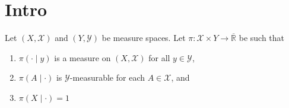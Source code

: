 %

\chapter{Intro}

\begin{definition}
    \label{def:properProbabilityKernel}
    \leanok
    Let $(X,\mathcal{X})$ and $(Y,\mathcal{Y})$ be measure spaces. Let $\pi:\mathcal{X}\times Y\to\overline{\mathbb{R}}$ be such that
    \begin{enumerate}
        \item $\pi(\cdot\mid y)$ is a measure on $(X,\mathcal{X})$ for all $y\in \mathcal{Y}$,
        \item $\pi(A\mid\cdot)$ is $\mathcal{Y}$-measurable for each $A\in\mathcal{X}$, and
        \item $\pi(X\mid\cdot)=1$
    \end{enumerate}
\end{definition}

\begin{definition}[Specification]
    \label{def:specification}
    \leanok
    
\end{definition}

\begin{lemma}

\end{lemma}

\begin{definition}[]


\end{definition}